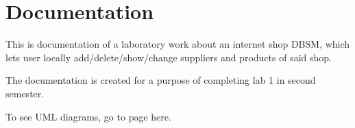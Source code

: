 \chapter{Documentation}
\hypertarget{index}{}\label{index}
This is documentation of a laboratory work about an internet shop DBSM, which lets user locally add/delete/show/change suppliers and products of said shop.

The documentation is created for a purpose of completing lab 1 in second semester.

To see UML diagrams, go to  page here. 